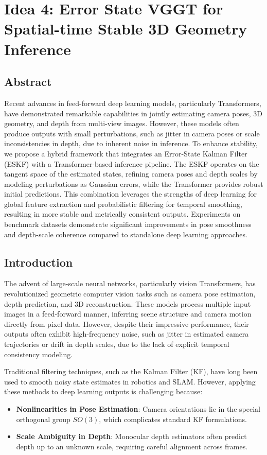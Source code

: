 \section{Idea 4: Error State VGGT for Spatial-time Stable 3D Geometry Inference}
\subsection{Abstract}
Recent advances in feed-forward deep learning models, particularly Transformers, have demonstrated remarkable capabilities in jointly estimating camera poses, 3D geometry, and depth from multi-view images. 
However, these models often produce outputs with small perturbations, such as jitter in camera poses or scale inconsistencies in depth, due to inherent noise in inference. 
To enhance stability, we propose a hybrid framework that integrates an Error-State Kalman Filter (ESKF) with a Transformer-based inference pipeline. The ESKF operates on the tangent space of the estimated states, refining camera poses and depth scales by modeling perturbations as Gaussian errors, while the Transformer provides robust initial predictions. 
This combination leverages the strengths of deep learning for global feature extraction and probabilistic filtering for temporal smoothing, resulting in more stable and metrically consistent outputs. 
Experiments on benchmark datasets demonstrate significant improvements in pose smoothness and depth-scale coherence compared to standalone deep learning approaches.

\subsection{Introduction}
The advent of large-scale neural networks, particularly vision Transformers, has revolutionized geometric computer vision tasks such as camera pose estimation, depth prediction, and 3D reconstruction. 
These models process multiple input images in a feed-forward manner, inferring scene structure and camera motion directly from pixel data. 
However, despite their impressive performance, their outputs often exhibit high-frequency noise, such as jitter in estimated camera trajectories or drift in depth scales, due to the lack of explicit temporal consistency modeling.

Traditional filtering techniques, such as the Kalman Filter (KF), have long been used to smooth noisy state estimates in robotics and SLAM. 
However, applying these methods to deep learning outputs is challenging because:
\begin{itemize}
	\item \textbf{Nonlinearities in Pose Estimation}: Camera orientations lie in the special orthogonal group $SO(3)$, which complicates standard KF formulations.
	\item \textbf{Scale Ambiguity in Depth}: Monocular depth estimators often predict depth up to an unknown scale, requiring careful alignment across frames.
\end{itemize}

